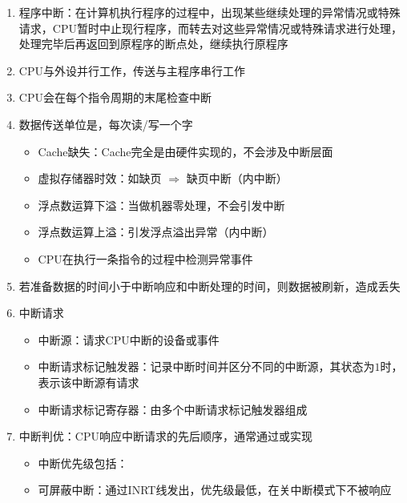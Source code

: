 \documentclass[./computer-organization-and-architecture.tex]{subfiles}
\begin{document}
    \begin{enumerate}
        \item 程序中断：在计算机执行程序的过程中，出现某些继续处理的异常情况或特殊请求，CPU暂时中止现行程序，而转去对这些异常情况或特殊请求进行处理，处理完毕后再返回到原程序的断点处，继续执行原程序
        \item CPU与外设并行工作，传送与主程序串行工作
        \item CPU会在每个指令周期的末尾检查中断
        \item 数据传送单位是{\color{red}{字}}，每次读/写一个字
        \begin{itemize}
            \item Cache缺失：Cache完全是由硬件实现的，不会涉及中断层面
            \item 虚拟存储器时效：如缺页 $\Rightarrow$ 缺页中断（内中断）
            \item 浮点数运算下溢：当做机器零处理，不会引发中断
            \item 浮点数运算上溢：引发浮点溢出异常（内中断）
            \item CPU在执行一条指令的过程中检测异常事件
        \end{itemize}
        \item 若准备数据的时间小于中断响应和中断处理的时间，则数据被刷新，造成丢失
        \item 中断请求
        \begin{itemize}
            \item 中断源：请求CPU中断的设备或事件
            \item 中断请求标记触发器：记录中断时间并区分不同的中断源，其状态为$1$时，表示该中断源有请求
            \item 中断请求标记寄存器：由多个中断请求标记触发器组成
        \end{itemize}
        \item 中断{\color{red}{响应}}判优：CPU响应中断请求的先后顺序，通常通过{\color{customgreen}{硬件排队器}}或{\color{customgreen}{终端查询程序}}实现
        \begin{itemize}
            \item 中断优先级包括：
            \item 可屏蔽中断：通过INRT线发出，优先级最低，在关中断模式下不被响应

\end{itemize}
\end{enumerate}
\end{document}
